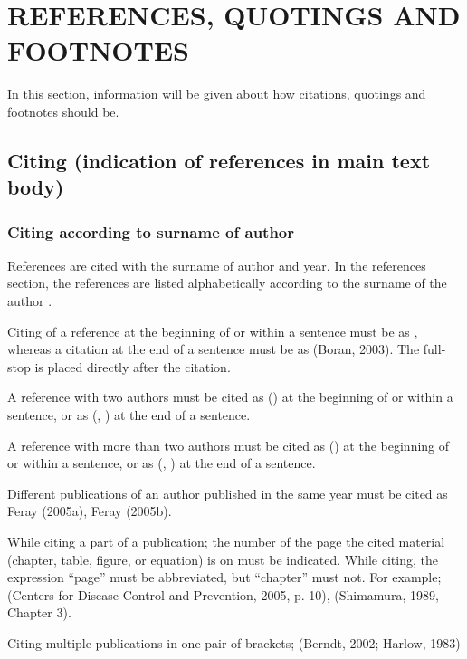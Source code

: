 \chapter{REFERENCES, QUOTINGS AND FOOTNOTES}\label{ch:ch4}

In this section, information will be given about how citations, quotings and footnotes should be.

\section{Citing (indication of references in main text body)}

\subsection{Citing according to surname of author}

References are cited with the surname of author and year. In the references section, the references are listed alphabetically according to the surname of the author \citep{acar97}.

Citing of a reference at the beginning of or within a sentence must be as \citet{harper2007}, whereas a citation at the end of a sentence must be as (Boran, 2003). The full-stop is placed directly after the citation. 

A reference with two authors must be cited as \citeauthor{mccaffrey88} (\citeyear{mccaffrey88}) at the beginning of or within a sentence, or as (\citeauthor{mccaffrey88}, \citeyear{mccaffrey88}) at the end of a sentence. 

A reference with more than two authors must be cited as \citeauthor{vanden2001} (\citeyear{vanden2001}) at the beginning of or within a sentence, or as (\citeauthor{vanden2001}, \citeyear{vanden2001}) at the end of a sentence. 

Different publications of an author published in the same year must be cited as Feray (2005a), Feray (2005b).

While citing a part of a publication; the number of the page the cited material (chapter, table, figure, or equation) is on must be indicated. While citing, the expression “page” must be abbreviated, but “chapter” must not. For example; (Centers for Disease Control and Prevention, 2005, p. 10), (Shimamura, 1989, Chapter 3). 

Citing multiple publications in one pair of brackets; (Berndt, 2002; Harlow, 1983) 

